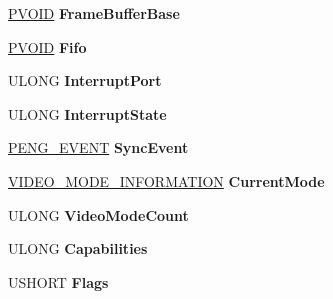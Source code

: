 \begin{DoxyCompactItemize}
\hyperlink{interfacevoid}{P\+V\+O\+ID} {\bfseries Frame\+Buffer\+Base}
\item 
\mbox{\label{struct___h_w___d_e_v_i_c_e___e_x_t_e_n_s_i_o_n_a543702a6149ed83e31ef44143794a211}} 
\hyperlink{interfacevoid}{P\+V\+O\+ID} {\bfseries Fifo}
\item 
\mbox{\label{struct___h_w___d_e_v_i_c_e___e_x_t_e_n_s_i_o_n_aea1f5720fd84af3581fc5829c92c9aa3}} 
U\+L\+O\+NG {\bfseries Interrupt\+Port}
\item 
\mbox{\label{struct___h_w___d_e_v_i_c_e___e_x_t_e_n_s_i_o_n_aba6ce66328438d05b41c3975942e8829}} 
U\+L\+O\+NG {\bfseries Interrupt\+State}
\item 
\mbox{\label{struct___h_w___d_e_v_i_c_e___e_x_t_e_n_s_i_o_n_a145d157269b574bbc2bb5f6cf23e2c9d}} 
\hyperlink{struct___e_n_g___e_v_e_n_t}{P\+E\+N\+G\+\_\+\+E\+V\+E\+NT} {\bfseries Sync\+Event}
\item 
\mbox{\label{struct___h_w___d_e_v_i_c_e___e_x_t_e_n_s_i_o_n_aaccf8d862e4b11ba883e80e2cd17301f}} 
\hyperlink{struct___v_i_d_e_o___m_o_d_e___i_n_f_o_r_m_a_t_i_o_n}{V\+I\+D\+E\+O\+\_\+\+M\+O\+D\+E\+\_\+\+I\+N\+F\+O\+R\+M\+A\+T\+I\+ON} {\bfseries Current\+Mode}
\item 
\mbox{\label{struct___h_w___d_e_v_i_c_e___e_x_t_e_n_s_i_o_n_ac2c91b48f9743e643e1f40eaac476eca}} 
U\+L\+O\+NG {\bfseries Video\+Mode\+Count}
\item 
\mbox{\label{struct___h_w___d_e_v_i_c_e___e_x_t_e_n_s_i_o_n_a3ba989933b83cc9d97650eb07f3bebf9}} 
U\+L\+O\+NG {\bfseries Capabilities}
\item 
\mbox{\label{struct___h_w___d_e_v_i_c_e___e_x_t_e_n_s_i_o_n_a9e6214a5d54732fa0e8288804dd66936}} 
U\+S\+H\+O\+RT {\bfseries Flags}
\item 
\mbox{\label{struct___h_w___d_e_v_i_c_e___e_x_t_e_n_s_i_o_n_a544f7ff477b8cedf04160e48c607f4f9}} 

\end{DoxyCompactItemize}
